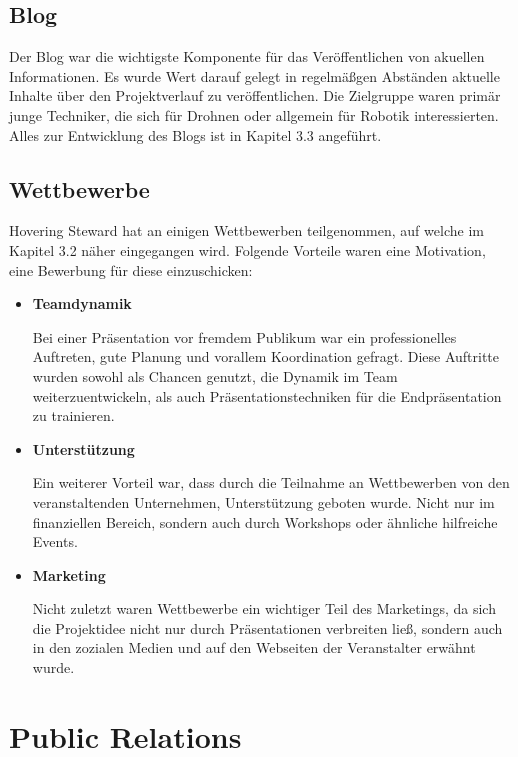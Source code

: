     \subsection*{Blog}
    Der Blog war die wichtigste Komponente für das Veröffentlichen von akuellen Informationen. Es wurde Wert darauf gelegt
    in regelmäßgen Abständen aktuelle Inhalte über den Projektverlauf zu veröffentlichen. Die Zielgruppe waren primär junge Techniker,
    die sich für Drohnen oder allgemein für Robotik interessierten. Alles zur Entwicklung des Blogs ist in Kapitel 3.3 angeführt.

    \subsection*{Wettbewerbe}
    Hovering Steward hat an einigen Wettbewerben teilgenommen, auf welche im Kapitel 3.2 näher eingegangen wird.
    Folgende Vorteile waren eine Motivation, eine Bewerbung für diese einzuschicken:

    \begin{itemize}
      \item \textbf{Teamdynamik}

      Bei einer Präsentation vor fremdem Publikum war ein professionelles Auftreten, gute Planung und vorallem Koordination gefragt.
      Diese Auftritte wurden sowohl als Chancen genutzt, die Dynamik im Team weiterzuentwickeln, als auch Präsentationstechniken für
      die Endpräsentation zu trainieren.

      \item \textbf{Unterstützung}

      Ein weiterer Vorteil war, dass durch die Teilnahme an Wettbewerben von den veranstaltenden Unternehmen, Unterstützung geboten wurde. Nicht nur im finanziellen
      Bereich, sondern auch durch Workshops oder ähnliche hilfreiche Events.

      \item \textbf{Marketing}

      Nicht zuletzt waren Wettbewerbe ein wichtiger Teil des Marketings, da sich die Projektidee nicht nur durch Präsentationen verbreiten ließ,
      sondern auch in den zozialen Medien und auf den Webseiten der Veranstalter erwähnt wurde.

    \end{itemize}


\section{Public Relations}

